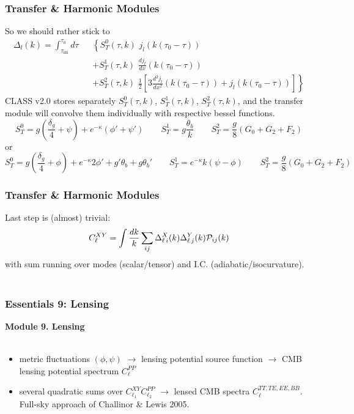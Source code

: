 
\begin{frame}[fragile]
\frametitle{Transfer \& Harmonic Modules}

So we should rather stick to
\begin{eqnarray}
\Delta_l (k) = \int_{\tau_\mathrm{ini}}^{\tau_0} d \tau \!\!\!\!\!\!\!\!\!\!\!\!&& \left\{  S_T^0(\tau,k) \,\, j_l(k(\tau_0-\tau))\right. \nonumber \\
&& + S_T^1(\tau,k) \,\, \frac{d j_l}{dx}(k(\tau_0-\tau)) \nonumber \\
&&\left. + S_T^2(\tau,k) \,\, \frac{1}{2}\left[3 \frac{d^2 j_l}{dx^2}(k(\tau_0-\tau)) + j_l(k(\tau_0-\tau)) \right]\right\} \nonumber
\end{eqnarray}
CLASS v2.0 stores separately  $S_T^0(\tau,k)$, $S_T^1(\tau,k)$, $S_T^2(\tau,k)$, and the transfer module will convolve them individually with respective bessel functions.
$$
S_T^0 = g \left(\frac{\delta_g}{4} +\psi \right) + e^{-\kappa} (\phi' + \psi') \qquad
S_T^1 = g \frac{\theta_b}{k}\qquad
S_T^2 = \frac{g}{8} \left( G_0 + G_2 + F_2 \right) 
$$
or
$$
S_T^0 = g \left(\frac{\delta_g}{4} +\phi \right) + e^{-\kappa} 2 \phi'  + g'\theta_b + g \theta_b' \qquad
S_T^1 = e^{-\kappa} k (\psi-\phi) \qquad
S_T^2 = \frac{g}{8} \left( G_0 + G_2 + F_2 \right) 
$$

\end{frame}

\begin{frame}[fragile]
\frametitle{Transfer \& Harmonic Modules}

Last step is (almost) trivial:
$$
C_\ell^{XY} = \int \frac{dk}{k}  \sum_{ij}  \Delta^X_{\ell \, i}(k)  \Delta^Y_{\ell \, j}(k) {\cal P}_{ij}(k)  
$$
with sum running over modes (scalar/tensor) and I.C. (adiabatic/isocurvature).\\
\mbox{} \\

\end{frame}

\begin{frame}[fragile]
\frametitle{Essentials 9: Lensing}

{\bf Module 9. Lensing}\\
\mbox{}\\
\begin{itemize}
\item
metric fluctuations $(\phi, \psi)$ $\rightarrow$ lensing potential source function $\rightarrow$ CMB lensing potential spectrum $C_\ell^{PP}$\\
\item
several quadratic sums over $C_{\ell_1}^{XY} C_{\ell_2}^{PP}$  $\rightarrow$ lensed CMB spectra $C_\ell^{TT,TE,EE,BB}$. Full-sky approach of Challinor \& Lewis 2005.
\end{itemize}

\end{frame}



